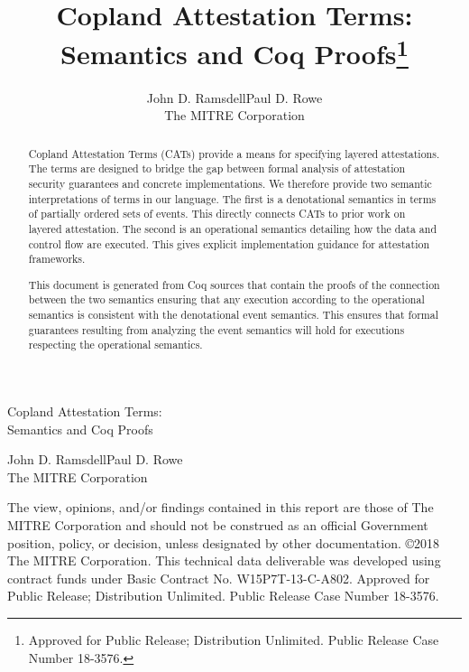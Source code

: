 \documentclass[12pt]{report}
\title{Copland Attestation Terms:\\
  Semantics and Coq Proofs\thanks{Approved for Public Release;
    Distribution Unlimited. Public Release Case Number 18-3576.}}
\author{John D. Ramsdell\qquad\qquad Paul D. Rowe\\[3ex]
  The MITRE Corporation}
\begin{document}
\begin{titlepage}
  \vspace*{7ex}
  \begin{center}\LARGE
    Copland Attestation Terms:\\
    Semantics and Coq Proofs
  \end{center}
  \vspace{3ex}
  \begin{center}\Large
    John D. Ramsdell\qquad\qquad Paul D. Rowe\\[3ex]
    The MITRE Corporation
  \end{center}
  \vfill
  The view, opinions, and/or findings contained in this report are
  those of The MITRE Corporation and should not be construed as an
  official Government position, policy, or decision, unless designated
  by other documentation.
  \noindent\copyright 2018 The MITRE Corporation. This technical data
  deliverable was developed using contract funds under Basic Contract
  No. W15P7T-13-C-A802.
  \noindent Approved for Public Release;
  Distribution Unlimited. Public Release Case Number 18-3576.
\end{titlepage}


\begin{abstract}
  Copland Attestation Terms (CATs) provide a means for
  specifying layered attestations.  The terms are designed to bridge
  the gap between formal analysis of attestation security guarantees
  and concrete implementations.  We therefore provide two semantic
  interpretations of terms in our language.  The first is a
  denotational semantics in terms of partially ordered sets of
  events.  This directly connects CATs to prior work on layered
  attestation.  The second is an operational semantics detailing how
  the data and control flow are executed.  This gives explicit
  implementation guidance for attestation frameworks.

  This document is generated from Coq sources that contain the proofs
  of the connection between the two semantics ensuring that any
  execution according to the operational semantics is consistent with
  the denotational event semantics.  This ensures that formal
  guarantees resulting from analyzing the event semantics will hold
  for executions respecting the operational semantics.
\end{abstract}
\end{document}
